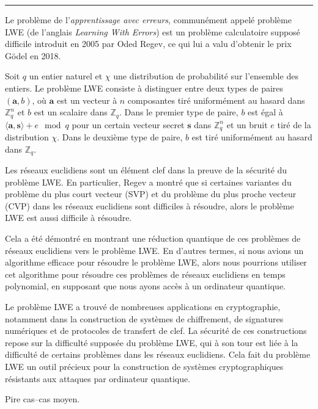 \vskip1cm
\hrule
\vskip1cm

Le problème de l’\emph{apprentissage avec erreurs}, communément appelé problème LWE (de l’anglais \emph{Learning With Errors}) est un problème calculatoire supposé difficile introduit en 2005 par Oded Regev\cite{STOC:Regev05}, ce qui lui a valu d’obtenir le prix Gödel en 2018.




Soit $q$ un entier naturel et $\chi$ une distribution de probabilité sur l'ensemble des entiers. Le problème LWE consiste à distinguer entre deux types de paires $(\mathbf{a}, b)$, où $\mathbf{a}$ est un vecteur à $n$ composantes tiré uniformément au hasard dans $\mathbb{Z}_q^n$ et $b$ est un scalaire dans $\mathbb{Z}_q$. Dans le premier type de paire, $b$ est égal à $\langle\mathbf{a},\mathbf{s}\rangle + e \mod q$ pour un certain vecteur secret $\mathbf{s}$ dans $\mathbb{Z}_q^n$ et un bruit $e$ tiré de la distribution $\chi$. Dans le deuxième type de paire, $b$ est tiré uniformément au hasard dans $\mathbb{Z}_q$.


Les réseaux euclidiens sont un élément clef dans la preuve de la sécurité du problème LWE. En particulier, Regev a montré que si certaines variantes du problème du plus court vecteur (SVP) et du problème du plus proche vecteur (CVP) dans les réseaux euclidiens sont difficiles à résoudre, alors le problème LWE est aussi difficile à résoudre.

Cela a été démontré en montrant une réduction quantique de ces problèmes de réseaux euclidiens vers le problème LWE. En d'autres termes, si nous avions un algorithme efficace pour résoudre le problème LWE, alors nous pourrions utiliser cet algorithme pour résoudre ces problèmes de réseaux euclidiens en temps polynomial, en supposant que nous ayons accès à un ordinateur quantique.


Le problème LWE a trouvé de nombreuses applications en cryptographie, notamment dans la construction de systèmes de chiffrement, de signatures numériques et de protocoles de transfert de clef. La sécurité de ces constructions repose sur la difficulté supposée du problème LWE, qui à son tour est liée à la difficulté de certains problèmes dans les réseaux euclidiens. Cela fait du problème LWE un outil précieux pour la construction de systèmes cryptographiques résistants aux attaques par ordinateur quantique.

Pire cas--cas moyen.






